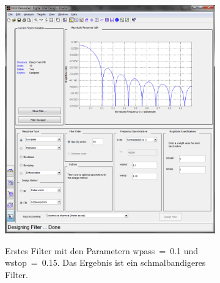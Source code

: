 \begin{figure} [h]
         \centering
         \caption{ Frequenzgänge der entworfenen Filter. Beide ähneln sich in den Parametern, verfügen jedoch über etwas unterschiedliche Eckfrequenzen. Als Entwurfsmethode wurde die sog. "Least-squares"-Methode verwendet. Diese Methode liefert gute Ergebnisse im Hinblick auf aöglichst kleine Sidelobes und eine geringe Anzahl an Taps. }
         \label{fig:3}
%         
         \begin{subfigure}[t]{0.5\textwidth}
                 \centering
                 \includegraphics[width=\textwidth]{common/img/filter.png}
                 \vspace{.1cm}
                 \caption{Erstes Filter mit den Parametern wpass~=~0.1 und wstop~=~0.15. Das Ergebnis ist ein schmalbandigeres Filter. }
                 \label{fig:Filter1_A}\textit{}
         \end{subfigure}
%         
\qquad
         \begin{subfigure}[t]{0.5\textwidth}
                 \centering

\end{subfigure}
\end{figure}
